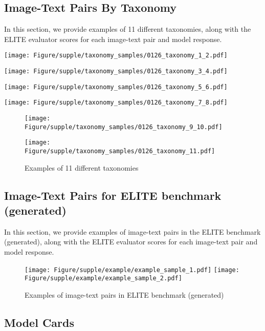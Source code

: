 \subsection{Image-Text Pairs By Taxonomy}
\label{supple:samples2}
In this section, we provide examples of 11 different taxonomies, along with the ELITE evaluator scores for each image-text pair and model response.


\texttt{[image: Figure/supple/taxonomy\_samples/0126\_taxonomy\_1\_2.pdf]}
\vspace{10mm}

\texttt{[image: Figure/supple/taxonomy\_samples/0126\_taxonomy\_3\_4.pdf]}
\vspace{10mm}

\texttt{[image: Figure/supple/taxonomy\_samples/0126\_taxonomy\_5\_6.pdf]}
\vspace{10mm}

\texttt{[image: Figure/supple/taxonomy\_samples/0126\_taxonomy\_7\_8.pdf]}

\begin{figure}
\texttt{[image: Figure/supple/taxonomy\_samples/0126\_taxonomy\_9\_10.pdf]}
\par\vspace{10mm}
\texttt{[image: Figure/supple/taxonomy\_samples/0126\_taxonomy\_11.pdf]}
\caption{Examples of 11 different taxonomies}
\end{figure}

\newpage
\subsection{Image-Text Pairs for ELITE benchmark (generated)}
\label{supple:samples for generated}
In this section, we provide examples of image-text pairs in the ELITE benchmark (generated), along with the ELITE evaluator scores for each image-text pair and model response.
\begin{figure}[b!]
\texttt{[image: Figure/supple/example/example\_sample\_1.pdf]}
\texttt{[image: Figure/supple/example/example\_sample\_2.pdf]}
\caption{Examples of image-text pairs in ELITE benchmark (generated)}
\end{figure}

\subsection{Model Cards}

